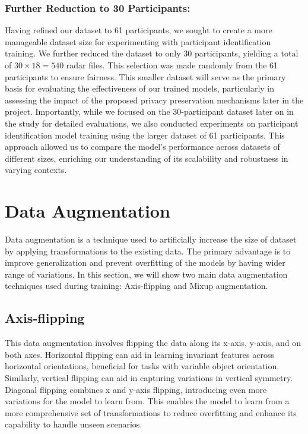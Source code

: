 \documentclass{l4proj}
\begin{document}
\subsubsection{Further Reduction to 30 Participants:}
Having refined our dataset to 61 participants, we sought to create a more manageable dataset size for experimenting with participant identification training. We further reduced the dataset to only 30 participants, yielding a total of $30 \times 18 = 540$ radar files. This selection was made randomly from the 61 participants to ensure fairness. This smaller dataset will serve as the primary basis for evaluating the effectiveness of our trained models, particularly in assessing the impact of the proposed privacy preservation mechanisms later in the project. Importantly, while we focused on the 30-participant dataset later on in the study for detailed evaluations, we also conducted experiments on participant identification model training using the larger dataset of 61 participants. This approach allowed us to compare the model's performance across datasets of different sizes, enriching our understanding of its scalability and robustness in varying contexts.

\section{Data Augmentation} \label{data_augmentation}
Data augmentation is a technique used to artificially increase the size of dataset by applying transformations to the existing data. The primary advantage is to improve generalization and prevent overfitting of the models by having wider range of variations. In this section, we will show two main data augmentation techniques used during training: Axis-flipping and Mixup augmentation.

\subsection{Axis-flipping}
This data augmentation involves flipping the data along its x-axis, y-axis, and on both axes. Horizontal flipping can aid in learning invariant features across horizontal orientations, beneficial for tasks with variable object orientation. Similarly, vertical flipping can aid in capturing variations in vertical symmetry. Diagonal flipping combines x and y-axis flipping, introducing even more variations for the model to learn from. This enables the model to learn from a more comprehensive set of transformations to reduce overfitting and enhance its capability to handle unseen scenarios.
\end{document}
